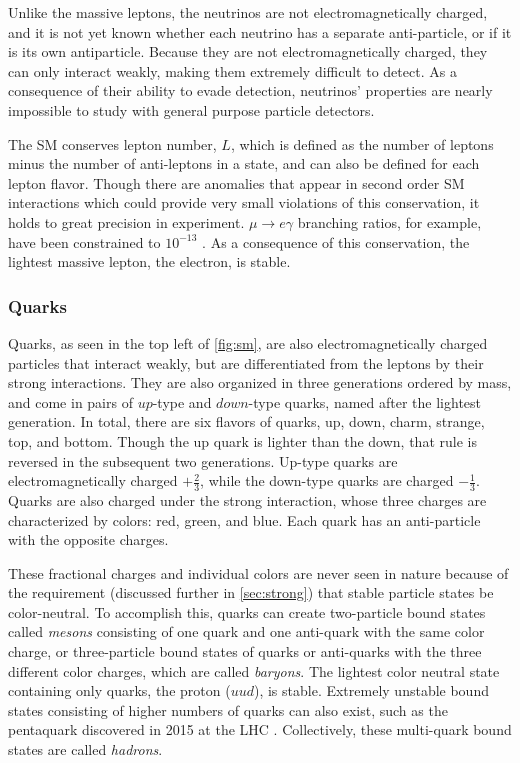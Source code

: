 Unlike the massive leptons, the neutrinos are not electromagnetically charged, and it is not yet known whether each neutrino has a separate anti-particle, or if it is its own antiparticle. Because they are not electromagnetically charged, they can only interact weakly, making them extremely difficult to detect. As a consequence of their ability to evade detection, neutrinos' properties are nearly impossible to study with general purpose particle detectors. 

The \ac{SM} conserves lepton number, $L$, which is defined as the number of leptons minus the number of anti-leptons in a state, and can also be defined for each lepton flavor. Though there are anomalies that appear in second order \ac{SM} interactions which could provide very small violations of this conservation, it holds to great precision in experiment. $\mu \rightarrow e\gamma$ branching ratios, for example, have been constrained to $10^{-13}$ \cite{1605.05081}. As a consequence of this conservation, the lightest massive lepton, the electron, is stable.

\subsubsection{Quarks}
\label{sec:quarks}

Quarks, as seen in the top left of \autoref{fig:sm}, are also electromagnetically charged particles that interact weakly, but are differentiated from the leptons by their strong interactions. They are also organized in three generations ordered by mass, and come in pairs of $up$-type and $down$-type quarks, named after the lightest generation. In total, there are six flavors of quarks, up, down, charm, strange, top, and bottom. Though the up quark is lighter than the down, that rule is reversed in the subsequent two generations. Up-type quarks are electromagnetically charged $+\frac{2}{3}$, while the down-type quarks are charged $-\frac{1}{3}$. Quarks are also charged under the strong interaction, whose three charges are characterized by colors: red, green, and blue. Each quark has an anti-particle with the opposite charges. 

These fractional charges and individual colors are never seen in nature because of the requirement (discussed further in \autoref{sec:strong}) that stable particle states be color-neutral. To accomplish this, quarks can create two-particle bound states called \textit{mesons} consisting of one quark and one anti-quark with the same color charge, or three-particle bound states of quarks or anti-quarks with the three different color charges, which are called \textit{baryons}. The lightest color neutral state containing only quarks, the proton ($uud$), is stable. Extremely unstable bound states consisting of higher numbers of quarks can also exist, such as the pentaquark discovered in 2015 at the \ac{LHC} \cite{Pentaquark}. Collectively, these multi-quark bound states are called \textit{hadrons}. 

